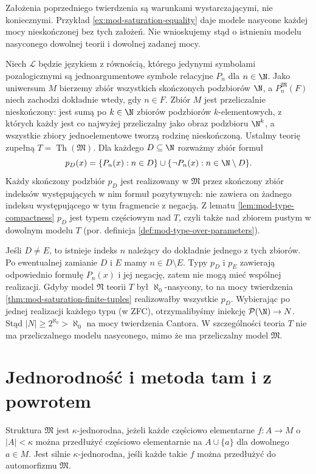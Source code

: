 \begin{uwaga}
Założenia poprzedniego twierdzenia są warunkami
wystarczającymi, nie koniecznymi. Przykład
\ref{ex:mod-saturation-equality} daje modele nasycone
każdej mocy nieskończonej bez tych założeń.
Nie wnioskujemy stąd o istnieniu modelu nasyconego
dowolnej teorii i dowolnej zadanej mocy.
\end{uwaga}

\begin{przyklad}
\label{ex:mod-saturation-cardinality-obstruction}
Niech $\mathcal L$ będzie językiem z równością,
którego jedynymi symbolami pozalogicznymi są
jednoargumentowe symbole relacyjne $P_n$ dla $n\in\N$.
Jako uniwersum $M$ bierzemy zbiór wszystkich skończonych
podzbiorów $\N$, a $P_n^{\mathfrak M}(F)$ niech zachodzi
dokładnie wtedy, gdy $n\in F$. Zbiór $M$ jest przeliczalnie
nieskończony: jest sumą po $k\in\N$ zbiorów podzbiorów
$k$-elementowych, z których każdy jest co najwyżej
przeliczalny jako obraz podzbioru $\N^k$, a wszystkie
zbiory jednoelementowe tworzą rodzinę nieskończoną.
Ustalmy teorię zupełną $T=\operatorname{Th}(\mathfrak M)$.
Dla każdego $D\subseteq\N$ rozważmy zbiór formuł
\[
p_D(x)=
\{P_n(x):n\in D\}\cup\{\neg P_n(x):n\in\N\setminus D\}.
\]
Każdy skończony podzbiór $p_D$ jest realizowany w $\mathfrak M$
przez skończony zbiór indeksów występujących w nim
formuł pozytywnych: nie zawiera on żadnego indeksu
występującego w tym fragmencie z negacją.
Z lematu \ref{lem:mod-type-compactness} $p_D$ jest typem
częściowym nad $T$, czyli także nad zbiorem pustym
w dowolnym modelu $T$ (por. definicja
\ref{def:mod-type-over-parameters}).

Jeśli $D\ne E$, to istnieje indeks $n$ należący do dokładnie
jednego z tych zbiorów. Po ewentualnej zamianie $D$ i $E$
mamy $n\in D\setminus E$. Typy $p_D$ i $p_E$ zawierają
odpowiednio formułę $P_n(x)$ i jej negację, zatem nie
mogą mieć wspólnej realizacji. Gdyby model $\mathfrak N$
teorii $T$ był $\aleph_0$-nasycony, to na mocy
twierdzenia \ref{thm:mod-saturation-finite-tuples}
realizowałby wszystkie $p_D$. Wybierając po jednej
realizacji każdego typu (w ZFC), otrzymalibyśmy
iniekcję $\mathcal P(\N)\to N$. Stąd
$|N|\geq 2^{\aleph_0}>\aleph_0$ na mocy twierdzenia
Cantora. W szczególności teoria $T$ nie ma
przeliczalnego modelu nasyconego, mimo że ma
przeliczalny model $\mathfrak M$.
\end{przyklad}

\section{Jednorodność i metoda tam i z powrotem}
\begin{definicja}
\label{def:mod-homogeneity}
Struktura $\mathfrak M$ jest $\kappa$-jednorodna,
jeżeli każde częściowo elementarne $f:A\to M$
o $|A|<\kappa$ można przedłużyć częściowo elementarnie
na $A\cup\{a\}$ dla dowolnego $a\in M$.
Jest silnie $\kappa$-jednorodna, jeśli każde takie $f$
można przedłużyć do automorfizmu $\mathfrak M$.
\end{definicja}

